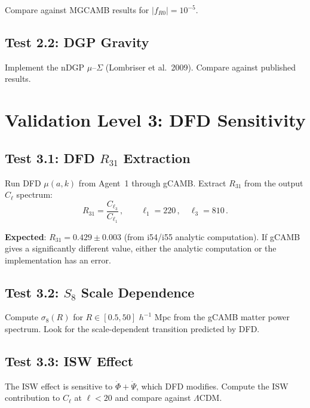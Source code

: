 \documentclass[11pt,a4paper]{article}
\begin{document}
Compare against MGCAMB results for $|f_{R0}| = 10^{-5}$.

\subsection{Test 2.2: DGP Gravity}

Implement the nDGP $\mu$--$\Sigma$ (Lombriser et al.\ 2009). Compare against published results.

\section{Validation Level 3: DFD Sensitivity}

\subsection{Test 3.1: DFD $R_{31}$ Extraction}

Run DFD $\mu(a,k)$ from Agent~1 through gCAMB. Extract $R_{31}$ from the output $C_\ell$ spectrum:
\begin{equation}
R_{31} = \frac{C_{\ell_3}}{C_{\ell_1}}\,,\qquad \ell_1 = 220\,,\quad \ell_3 = 810\,.
\end{equation}

\textbf{Expected}: $R_{31} = 0.429 \pm 0.003$ (from i54/i55 analytic computation). If gCAMB gives a significantly different value, either the analytic computation or the implementation has an error.

\subsection{Test 3.2: $S_8$ Scale Dependence}

Compute $\sigma_8(R)$ for $R \in [0.5, 50]$ $h^{-1}$ Mpc from the gCAMB matter power spectrum. Look for the scale-dependent transition predicted by DFD.

\subsection{Test 3.3: ISW Effect}

The ISW effect is sensitive to $\dot{\Phi} + \dot{\Psi}$, which DFD modifies. Compute the ISW contribution to $C_\ell$ at $\ell < 20$ and compare against $\Lambda$CDM.
\end{document}
